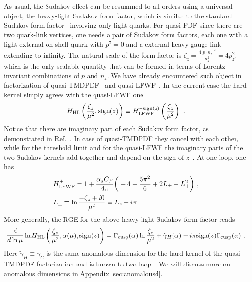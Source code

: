 \documentclass[a4paper,11pt]{article}
\begin{document}
As usual, the Sudakov effect can be resummed to all orders using a universal object, the heavy-light Sudakov form factor, which is similar to the standard Sudakov form factor~\cite{Sudakov:1954sw,Collins:1989bt,Moch:2005id,Baikov:2009bg} involving only light-quarks. For quasi-PDF since there are two quark-link vertices, one needs a pair of Sudakov form factors, each one with a light external on-shell quark with $p^2=0$ and a external heavy gauge-link extending to infinity.  The natural scale of the form factor is $\zeta_z=\frac{4|p\cdot n_z|^2}{n_z^2}=4 p_z^2$, 
which is the only scalable quantity that can be formed in terms of Lorentz invariant combinations of $p$ and $n_z$. We have already encountered such object in factorization of quasi-TMDPDF~\cite{Ebert:2019okf,Ji:2019ewn,Ji:2020ect,Vladimirov:2020ofp,Ebert:2020gxr,Ebert:2022fmh} and quasi-LFWF~\cite{Ji:2021znw,Ji:2020ect}. In the current case the hard kernel simply agrees with the quasi-LFWF one
\begin{align}
H_{\rm HL}\left(\frac{\zeta_z}{\mu^2},{\rm sign}(z)\right) \equiv H_{\rm LFWF}^{-{\rm sign}(z)}\left(\frac{\zeta_z}{\mu^2}\right) \ .
\end{align}
Notice that there are imaginary part of each Sudakov form factor, as demonstrated in Ref.~\cite{Ji:2021znw}. In case of quasi-TMDPDF they cancel with each other, while for the threshold limit and for the quasi-LFWF the imaginary parts of the two Sudakov kernels add together and depend on the sign of $z$~\cite{Ji:2021znw}. At one-loop, one has~\cite{Ji:2021znw} 
\begin{align}
&H^{\pm}_{\rm LFWF}=1+\frac{\alpha_s C_F}{4\pi} \bigg(-4-\frac{5\pi^2}{6}+2L_{\pm}-L_{\pm}^2\bigg) \ , \\ 
&L_{\pm}\equiv \ln \frac{-\zeta_z+i0}{\mu^2}=L_z\pm i\pi \ .
\end{align}
More generally, the RGE for the above heavy-light Sudakov form factor reads~\cite{Ji:2019ewn,Ji:2021znw}
\begin{align}\label{eq:RGEH}
\frac{d}{d\ln \mu} \ln H_{\rm HL}\left(\frac{\zeta_z}{\mu^2},\alpha(\mu),{\rm sign}(z)\right)=\Gamma_{\rm cusp}(\alpha)\ln\frac{\zeta_z}{\mu^2}+\tilde {\gamma}_{H}(\alpha)-i\pi{\rm sign}(z)\Gamma_{\rm cusp}(\alpha) \ .
\end{align}
Here $\tilde \gamma_{H} \equiv \gamma_C$ is the same anomalous dimension for the hard kernel of the quasi-TMDPDF factorization and is known to two-loop~\cite{Ji:2019ewn,Ji:2021znw}. We will discuss more on anomalous dimensions in Appendix \ref{sec:anomalousd}. 
\end{document}
